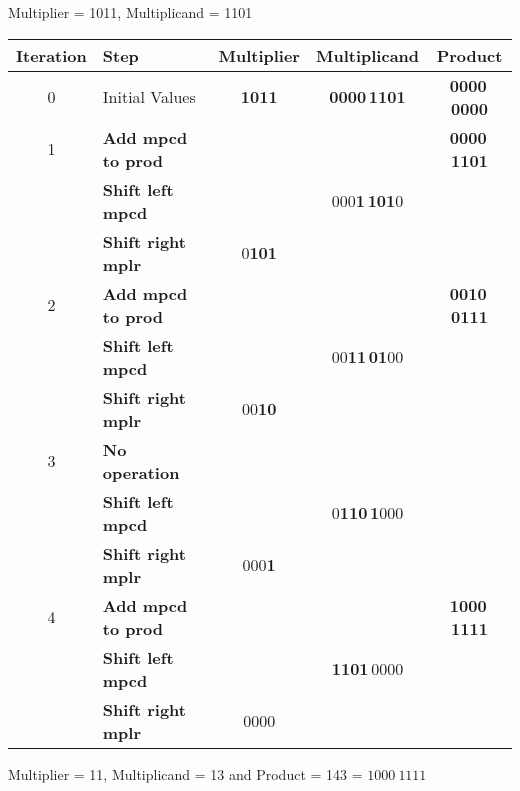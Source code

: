 

\begin{frame}[fragile]


Multiplier = 1011, Multiplicand = 1101

\begin{tabular}{|c|l|c|c|c|} \hline
Iteration & Step & Multiplier & Multiplicand & Product \\ \hline
0 & Initial Values   & \textbf{1011} &\textbf{ 0000\,1101}  & \textbf{0000\,0000} \\ \hline
1 & \textbf{Add mpcd to prod} &      &             & \textbf{0000\,1101} \\
  & \textbf{{\color{red}Shift left mpcd}}  &      & 000\textbf{{\color{red}1\,101}}0  &          \\
  & \textbf{{\color{blue}Shift right mplr}} & 0\textbf{{\color{blue}101}} &             &          \\ \hline
2 & \textbf{Add mpcd to prod} &      &             & \textbf{0010\,0111} \\
  & \textbf{{\color{red}Shift left mpcd}}  &      & 00\textbf{{\color{red}11\,01}}00  &          \\
  & \textbf{{\color{blue}Shift right mplr}} & 00\textbf{{\color{blue}10}} &             &          \\ \hline
3 & \textbf{No operation }    &      &             &          \\
  & \textbf{{\color{red}Shift left mpcd}}  &      & 0\textbf{{\color{red}110\,1}}000  &          \\
  &\textbf{{\color{blue}Shift right mplr}} & 000\textbf{{\color{blue}1}} &             &          \\ \hline
4 & \textbf{Add mpcd to prod} &      &             & \textbf{1000\,1111} \\
  & \textbf{{\color{red}Shift left mpcd}}   &      & \textbf{{\color{red}1101}}\,0000  &          \\
  & \textbf{{\color{blue}Shift right mplr}} & 0000 &             &          \\ \hline
\end{tabular}
Multiplier = 11, Multiplicand = 13 and Product = 143 = $1000\ 1111$


\end{frame}
